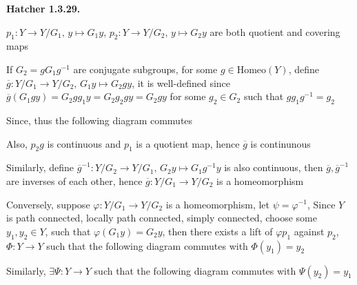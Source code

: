 \documentclass[12pt]{article}
\begin{document}
\textbf{Hatcher 1.3.29.} \par
$p_1:Y\rightarrow Y/G_1, \, y\mapsto G_1y, \,p_2:Y\rightarrow Y/G_2, \, y\mapsto G_2y$ are both quotient and covering maps \par
If $G_2=gG_1g^{-1}$ are conjugate subgroups, for some $g\in \mathrm{Homeo}(Y)$, define $\overline{g}:Y/G_1 \rightarrow Y/G_2, \, G_1y\mapsto G_2gy $, it is well-defined since $\overline{g}(G_1gy)=G_2gg_1y=G_2g_2gy=G_2gy$ for some $g_2\in G_2$ such that $gg_1g^{-1}=g_2$ \par
Since, thus the following diagram commutes
\begin{center}
\end{center}
Also, $p_2g$ is continuous and $p_1$ is a quotient map, hence $\overline{g}$ is continunous \par
Similarly, define $\overline{g}^{-1}:Y/G_2\rightarrow Y/G_1, \, G_2y\mapsto G_1g^{-1}y$ is also continuous, then $\overline{g},\overline{g}^{-1}$ are inverses of each other, hence $\overline{g}:Y/G_1 \rightarrow Y/G_2$ is a homeomorphism \par
Conversely, suppose $\varphi:Y/G_1 \rightarrow Y/G_2$ is a homeomorphism, let $\psi=\varphi^{-1}$, Since $Y$ is path connected, locally path connected, simply connected, choose some $y_1,y_2\in Y$, such that $\varphi(G_1y)=G_2y$, then there exists a lift of $\varphi p_1$ against $p_2$, $\Phi:Y\rightarrow Y$ such that the following diagram commutes with $\Phi(y_1)=y_2$ \par
\begin{center}
\end{center}
Similarly, $\exists\Psi:Y\rightarrow Y$ such that the following diagram commutes with $\Psi(y_2)=y_1$ \par
\begin{center}
\end{center}
\end{document}
